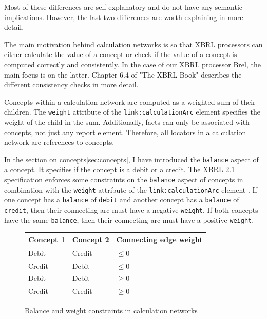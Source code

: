 Most of these differences are self-explanatory and do not have any semantic implications.
However, the last two differences are worth explaining in more detail.

The main motivation behind calculation networks is so that XBRL processors can either calculate the value of a concept or check if the value of a concept is computed correctly and consistently.
In the case of our XBRL processor Brel, the main focus is on the latter. 
Chapter 6.4 of "The XBRL Book" \cite{fourny2023xbrl} describes the different consistency checks in more detail.

Concepts within a calculation network are computed as a weighted sum of their children.
The \texttt{weight} attribute of the \texttt{link:calculationArc} element specifies the weight of the child in the sum.
Additionally, facts can only be associated with concepts, not just any report element.
Therefore, all locators in a calculation network are references to concepts.

In the section on concepts\ref{sec:concepts}, I have introduced the \texttt{balance} aspect of a concept.
It specifies if the concept is a debit or a credit.
The XBRL 2.1 specification enforces some constraints on the \texttt{balance} aspect of concepts in combination with the \texttt{weight} attribute of the \texttt{link:calculationArc} element \cite{xbrl21_concept}.
If one concept has a \texttt{balance} of \texttt{debit} and another concept has a \texttt{balance} of \texttt{credit}, then their connecting arc must have a negative \texttt{weight}.
If both concepts have the same \texttt{balance}, then their connecting arc must have a positive \texttt{weight}.

\begin{figure}[H]
    \label{fig:balance_weight_constraints}
    \centering
    \begin{tabular}{|l|l|l|}
        \hline
        \textbf{Concept 1} & \textbf{Concept 2} & \textbf{Connecting edge weight} \\ \hline
        Debit              & Credit             & $\leq 0$        \\ \hline
        Credit             & Debit              & $\leq 0$        \\ \hline
        Debit              & Debit              & $\geq 0$        \\ \hline
        Credit             & Credit             & $\geq 0$        \\ \hline
    \end{tabular}
    \caption{Balance and weight constraints in calculation networks}
\end{figure}

